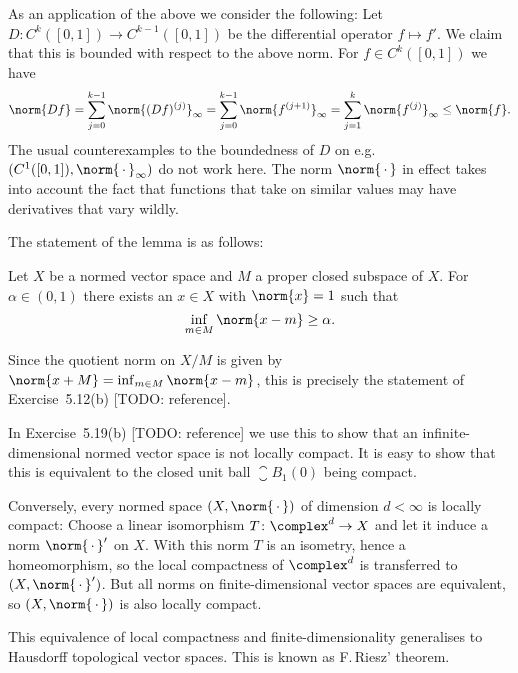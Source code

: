 \documentclass[article, a4paper, 11pt, oneside]{memoir}
\numberwithin{equation}{chapter}
\newenvironment{displaytheorem}{%
	\begin{displayquote}\itshape%
}{%
	\end{displayquote}%
}
\theoremstyle{nonumberplain}
\begin{document}
\begin{remark}
	As an application of the above we consider the following: Let $D \colon C^k([0,1]) \to C^{k-1}([0,1])$ be the differential operator $f \mapsto f'$. We claim that this is bounded with respect to the above norm. For $f \in C^k([0,1])$ we have
	\begin{equation*}
		\norm{Df}
			= \sum_{j=0}^{k-1} \norm{(Df)^{(j)}}_\infty
			= \sum_{j=0}^{k-1} \norm{f^{(j+1)}}_\infty
			= \sum_{j=1}^k \norm{f^{(j)}}_\infty
			\leq \norm{f}.
	\end{equation*}
	The usual counterexamples to the boundedness of $D$ on e.g. $(C^1([0,1]), \norm{\,\cdot\,}_\infty)$ do not work here. The norm $\norm{\,\cdot\,}$ in effect takes into account the fact that functions that take on similar values may have derivatives that vary wildly.
\end{remark}


\begin{remarkbreak}
	The statement of the lemma is as follows:
	\begin{displaytheorem}
		Let $X$ be a normed vector space and $M$ a proper closed subspace of $X$. For $\alpha \in (0,1)$ there exists an $x \in X$ with $\norm{x} = 1$ such that
		\begin{equation*}
			\inf_{m \in M} \norm{x - m} \geq \alpha.
		\end{equation*}
	\end{displaytheorem}
	Since the quotient norm on $X/M$ is given by $\norm{x+M} = \inf_{m \in M} \norm{x-m}$, this is precisely the statement of Exercise~5.12(b) [TODO: reference].

	In Exercise~5.19(b) [TODO: reference] we use this to show that an infinite-dimensional normed vector space is not locally compact. It is easy to show that this is equivalent to the closed unit ball $\closure{B}_1(0)$ being compact.
	
	Conversely, every normed space $(X, \norm{\,\cdot\,})$ of dimension $d < \infty$ is locally compact: Choose a linear isomorphism $T \colon \complex^d \to X$ and let it induce a norm $\norm{\,\cdot\,}'$ on $X$. With this norm $T$ is an isometry, hence a homeomorphism, so the local compactness of $\complex^d$ is transferred to $(X, \norm{\,\cdot\,}')$. But all norms on finite-dimensional vector spaces are equivalent, so $(X, \norm{\,\cdot\,})$ is also locally compact.

	This equivalence of local compactness and finite-dimensionality generalises to Hausdorff topological vector spaces. This is known as F.\,Riesz' theorem.
\end{remarkbreak}
\end{document}
